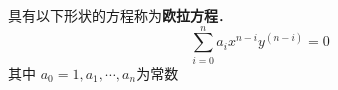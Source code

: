 
\begin{issues}
\issueDraft
\end{issues}

具有以下形状的方程称为\textbf{欧拉方程}．
\begin{equation}
\sum_{i=0}^{n}a_ix^{n-i}y^{(n-i)}=0
\end{equation}
其中 $a_0=1,a_1,\cdots,a_n$为常数